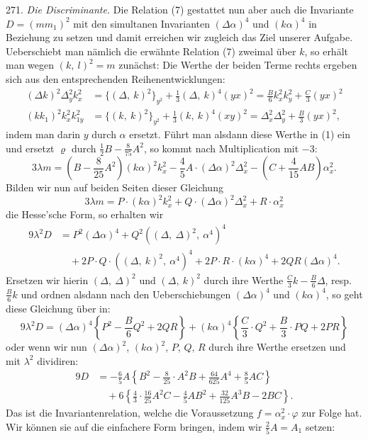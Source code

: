 271. \textit{Die Discriminante.} Die Relation (7) gestattet nun aber
auch die Invariante $D=(mm_1)^2$ mit den simultanen Invarianten
$(\varDelta\alpha)^4$ und $(k\alpha)^4$ in Beziehung zu setzen und damit erreichen wir zugleich
 das Ziel unserer Aufgabe. Ueberschiebt man nämlich die erwähnte
 Relation (7) zweimal über $k$, so erhält man wegen $(k,\ l)^2=m$
zunächst:
Die Werthe der beiden Terme rechts ergeben sich aus den entsprechenden
 Reihenentwicklungen:
\[
\begin{aligned}
(\varDelta k)^2\varDelta_y^2k_x^2 &= \{(\varDelta,\ k)^2\}_{y^2}+\frac{1}{3}(\varDelta,\ k)^4(yx)^2=\frac{B}{6}k_x^2k_y^2+\frac{C}{3}(yx)^2\\
(kk_1)^2k_x^2k_{1y}^2 &= \{(k,\ k)^2\}_{y^2}+\frac{1}{3}(k,\ k)^4(xy)^2=\varDelta_x^2\varDelta_y^2+\frac{B}{3}(yx)^2,
\end{aligned}
\]
indem man darin $y$ durch $\alpha$ ersetzt. Führt man alsdann diese
Werthe in (1) ein und ersetzt $\varrho$ durch $\frac{1}{2}B-\frac{8}{75}A^2$, so kommt
nach Multiplication mit $-3$:
\[
3\lambda m=\left(B-\frac{8}{25}A^2\right)(k\alpha)^2k_x^2-\frac{4}{5}A\cdot(\varDelta\alpha)^2\varDelta_x^2-\left(C+\frac{4}{15}AB\right)\alpha_x^2.
\]
Bilden wir nun auf beiden Seiten dieser Gleichung
\[
3\lambda m=P\cdot(k\alpha)^2k_x^2+Q\cdot(\varDelta\alpha)^2\varDelta_x^2+R\cdot\alpha_x^2
\]
die Hesse'sche Form, so erhalten wir
\[
\begin{aligned}
9\lambda^2D &= P^2(\varDelta\alpha)^4+Q^2((\varDelta,\ \varDelta)^2,\ \alpha^4)^4\\
&\quad+2P\cdot Q\cdot((\varDelta,\ k)^2,\ \alpha^4)^4+2P\cdot R\cdot(k\alpha)^4+2QR(\varDelta\alpha)^4.
\end{aligned}
\]
Ersetzen wir hierin $(\varDelta,\ \varDelta)^2$ und $(\varDelta,\ k)^2$ durch ihre Werthe
$\frac{C}{3}k-\frac{B}{6}\varDelta$, resp. $\frac{B}{6}k$ und ordnen alsdann nach den Ueberschiebungen
$(\varDelta\alpha)^4$ und $(k\alpha)^4$, so geht diese Gleichung über in:
\[
9\lambda^2D=(\varDelta\alpha)^4\left\{P^2-\frac{B}{6}Q^2+2QR\right\}+(k\alpha)^4\left\{\frac{C}{3}\cdot Q^2+\frac{B}{3}\cdot PQ+2PR\right\}
\]
oder wenn wir nun $(\varDelta\alpha)^2$, $(k\alpha)^2$, $P$, $Q$, $R$ durch ihre Werthe ersetzen
und mit $\lambda^2$ dividiren: %
\[
\begin{aligned}
9D &= -\frac{6}{5}A\left\{B^2-\frac{8}{25}\cdot A^2B+\frac{64}{625}A^4+\frac{8}{5}AC\right\}\\
&\quad+6\left\{\frac{4}{3}\cdot\frac{16}{25}A^2C-\frac{4}{5}AB^2+\frac{32}{125}A^3B-2BC\right\}.
\end{aligned}
\]
Das ist die Invariantenrelation, welche die Voraussetzung $f=\alpha_x^2\cdot\varphi$
zur Folge hat. Wir können sie auf die einfachere Form bringen,
indem wir $\frac{2}{5}A=A_1$ setzen:


